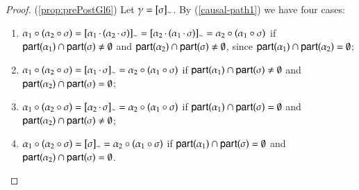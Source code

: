 \begin{proof}
  (\ref{prop:prePostGl6}) Let $\comocc=\eqclass{\comseq}$. By (\ref{causal-path1}) we have four cases: 
  \begin{enumerate}[label=(\alph*)]%
  \item $\preG{(\preG{\comseq}{\alpha_2})}{\alpha_1}=\eqclass{\concat{\alpha_1}{(\concat{\alpha_2}\comseq)}}=\eqclass{\concat{\alpha_2}{(\concat{\alpha_1}\comseq)}}=\preG{(\preG{\comseq}{\alpha_1})}{\alpha_2}$ if $\participant{\alpha_1}\cap\participant{\comseq}\not=\emptyset$ and $\participant{\alpha_2}\cap\participant{\comseq}\not=\emptyset$, since $\participant{\alpha_1}\cap\participant{\alpha_2}=\emptyset$;
  \item $\preG{(\preG{\comseq}{\alpha_2})}{\alpha_1}=\eqclass{\concat{\alpha_1}\comseq}=\preG{(\preG{\comseq}{\alpha_1})}{\alpha_2}$ if $\participant{\alpha_1}\cap\participant{\comseq}\not=\emptyset$ and $\participant{\alpha_2}\cap\participant{\comseq}=\emptyset$;
   \item $\preG{(\preG{\comseq}{\alpha_2})}{\alpha_1}=\eqclass{\concat{\alpha_2}\comseq}=\preG{(\preG{\comseq}{\alpha_1})}{\alpha_2}$ if $\participant{\alpha_1}\cap\participant{\comseq}=\emptyset$ and $\participant{\alpha_2}\cap\participant{\comseq}\not=\emptyset$;
    \item $\preG{(\preG{\comseq}{\alpha_2})}{\alpha_1}=\eqclass{\comseq}=\preG{(\preG{\comseq}{\alpha_1})}{\alpha_2}$ if $\participant{\alpha_1}\cap\participant{\comseq}=\emptyset$ and $\participant{\alpha_2}\cap\participant{\comseq}=\emptyset$.
  \end{enumerate}
  

\end{proof}
